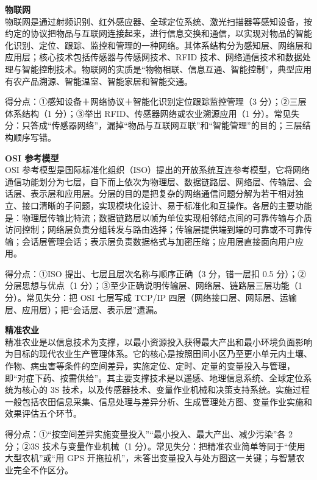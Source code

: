 \documentclass[a4paper,11pt]{article}
\begin{document}
\q \textbf{物联网}\\
物联网是通过射频识别、红外感应器、全球定位系统、激光扫描器等感知设备，按约定的协议把物品与互联网连接起来，进行信息交换和通信，以实现对物品的智能化识别、定位、跟踪、监控和管理的一种网络。其体系结构分为感知层、网络层和应用层；核心技术包括传感器与传感网技术、RFID 技术、网络通信技术和数据处理与智能控制技术。物联网的实质是“物物相联、信息互通、智能控制”，典型应用有农产品溯源、智能温室、智能家居和智能交通。
\begin{analysis}得分点：①感知设备＋网络协议＋智能化识别定位跟踪监控管理（3 分）；②三层体系结构（1 分）；③举出 RFID、传感器网络或农业溯源应用（1 分）。常见失分：只答成“传感器网络”，漏掉“物品与互联网互联”和“智能管理”的目的；三层结构顺序写错。\end{analysis}

\q \textbf{OSI 参考模型}\\
OSI 参考模型是国际标准化组织（ISO）提出的开放系统互连参考模型，它将网络通信功能划分为七层，自下而上依次为物理层、数据链路层、网络层、传输层、会话层、表示层和应用层。分层的目的是把复杂的网络通信问题分解为若干相对独立、接口清晰的子问题，实现模块化设计、易于标准化和互操作。各层的主要功能是：物理层传输比特流；数据链路层以帧为单位实现相邻结点间的可靠传输与介质访问控制；网络层负责分组转发与路由选择；传输层提供端到端的可靠或不可靠传输；会话层管理会话；表示层负责数据格式与加密压缩；应用层直接面向用户应用。
\begin{analysis}得分点：①ISO 提出、七层且层次名称与顺序正确（3 分，错一层扣 0.5 分）；②分层思想与优点（1 分）；③至少正确说明传输层、网络层、链路层三层功能（1 分）。常见失分：把 OSI 七层写成 TCP/IP 四层（网络接口层、网际层、运输层、应用层）；把“会话层、表示层”遗漏。\end{analysis}

\q \textbf{精准农业}\\
精准农业是以信息技术为支撑，以最小资源投入获得最大产出和最小环境负面影响为目标的现代农业生产管理体系。它的核心是按照田间小区乃至更小单元内土壤、作物、病虫害等条件的空间差异，实施定位、定时、定量的变量投入与管理，即“对症下药、按需供给”。其主要支撑技术是以遥感、地理信息系统、全球定位系统为核心的 3S 技术，以及传感器技术、变量作业机械和决策支持系统。实施过程一般包括农田信息采集、信息处理与差异分析、生成管理处方图、变量作业实施和效果评估五个环节。
\begin{analysis}得分点：①“按空间差异实施变量投入”“最小投入、最大产出、减少污染”各 2 分；②3S 技术与变量作业机械（1 分）。常见失分：把精准农业简单等同于“使用大型农机”或“用 GPS 开拖拉机”，未答出变量投入与处方图这一关键；与智慧农业完全不作区分。\end{analysis}
\end{document}
